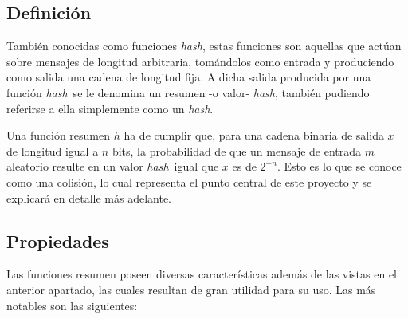 \documentclass[12pt,spanish,listoffigures,listoftables,listofalgorithms]{tfgetsinf}
\newcommand{\hash}{\textit{hash}}
\begin{document}
\subsection{Definición}

También conocidas como funciones \hash, estas funciones son aquellas que actúan sobre mensajes de longitud arbitraria, tomándolos como entrada y produciendo como salida una cadena de longitud fija. A dicha salida producida por una función \hash~se le denomina un resumen -o valor- \hash, también pudiendo referirse a ella simplemente como un \hash.

Una función resumen $h$ ha de cumplir que, para una cadena binaria de salida $x$ de longitud igual a $n$ bits, la probabilidad de que un mensaje de entrada $m$ aleatorio resulte en un valor \hash~igual que $x$ es de $2^{-n}$. Esto es lo que se conoce como una colisión, lo cual representa el punto central de este proyecto y se explicará en detalle más adelante.






\subsection{Propiedades}

Las funciones resumen poseen diversas características además de las vistas en el anterior apartado, las cuales resultan de gran utilidad para su uso. Las más notables son las siguientes:
\end{document}
